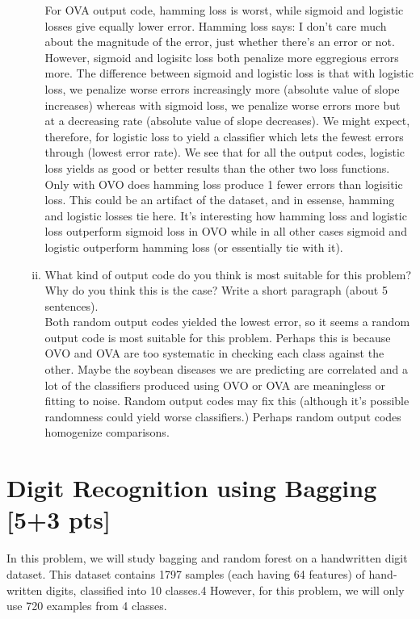 \documentclass[11pt]{article}
\begin{document}
\begin{enumerate}[(a)]
\begin{enumerate}[i.]
	For OVA output code, hamming loss is worst, while sigmoid and logistic losses give equally lower error. Hamming loss says: I don't care much about the magnitude of the error, just whether there's an error or not. However, sigmoid and logisitc loss both penalize more eggregious errors more. The difference between sigmoid and logistic loss is that with logistic loss, we penalize worse errors increasingly more (absolute value of slope increases) whereas with sigmoid loss, we penalize worse errors more but at a decreasing rate (absolute value of slope decreases). We might expect, therefore, for logistic loss to yield a classifier which lets the fewest errors through (lowest error rate). We see that for all the output codes, logistic loss yields as good or better results than the other two loss functions. Only with OVO does hamming loss produce 1 fewer errors than logisitic loss. This could be an artifact of the dataset, and in essense, hamming and logistic losses tie here. It's interesting how hamming loss and logistic loss outperform sigmoid loss in OVO while in all other cases sigmoid and logistic outperform hamming loss (or essentially tie with it). \\

	\item What kind of output code do you think is most suitable for this problem? Why do you think this is the case? Write a short paragraph (about 5 sentences). \\

	Both random output codes yielded the lowest error, so it seems a random output code is most suitable for this problem. Perhaps this is because OVO and OVA are too systematic in checking each class against the other. Maybe the soybean diseases we are predicting are correlated and a lot of the classifiers produced using OVO or OVA are meaningless or fitting to noise. Random output codes may fix this (although it's possible randomness could yield worse classifiers.) Perhaps random output codes homogenize comparisons. 

\end{enumerate}

\end{enumerate}

\section{Digit Recognition using Bagging [5+3 pts]}

In this problem, we will study bagging and random forest on a handwritten digit dataset. This dataset contains 1797 samples (each having 64 features) of hand-written digits, classified into 10 classes.4 However, for this problem, we will only use 720 examples from 4 classes.
\end{document}
